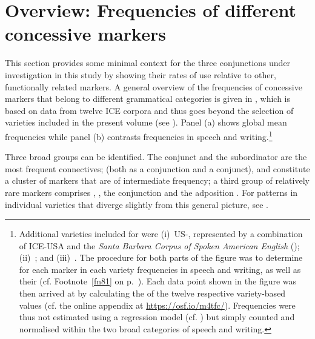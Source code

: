 \section{\label{bkm:Ref481681511}\label{bkm:Ref488072060}Overview: Frequencies of different concessive markers}\label{sec:7.1}

This section provides some minimal context for the three conjunctions under investigation in this study by showing their rates of use relative to other, functionally related markers. A general overview of the frequencies of concessive markers that belong to different grammatical categories is given in , which is based on data from twelve ICE corpora and thus goes beyond the selection of varieties included in the present volume (see \citealt{Schützler2018c}). Panel (a) shows global mean frequencies while panel (b) contrasts frequencies in speech and writing.\footnote{Additional varieties included for  were
(i)~US-, represented by a combination of ICE-USA and the \textit{Santa Barbara Corpus of Spoken American English} (\citealt{DuBoisEtAl2000}); 
(ii)~; and
(iii)~. The procedure for both parts of the figure was to determine for each marker in each variety frequencies in speech and writing, as well as their  (cf. Footnote~\ref{fn81} on p.~\pageref{fn81}). Each data point shown in the figure was then arrived at by calculating the  of the twelve respective variety-based values (cf. the online appendix at \url{https://osf.io/m4tfc/}). Frequencies were thus not estimated using a regression model (cf. ) but simply counted and normalised within the two broad categories of speech and writing.}

  Three broad groups can be identified. The conjunct  and the subordinator  are the most frequent connectives;  (both as a conjunction and a conjunct),  and  constitute a cluster of markers that are of intermediate frequency; a third group of relatively rare markers comprises , , the conjunction  and the adposition . For patterns in individual varieties that diverge slightly from this general picture, see \citet[158]{Schützler2018c}.

